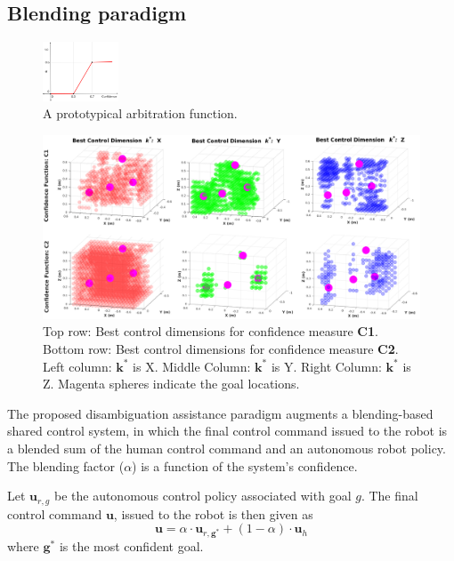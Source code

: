 \documentclass[conference]{IEEEtran}
\begin{document}
\subsection{Blending paradigm}\label{BP}
\begin{figure}
	\begin{center}
		\vspace{-0.9cm}
		\includegraphics[width=0.2\textwidth]{./figures/ArbFunc.png}
	\end{center}
	\caption{A prototypical arbitration function.}
	\label{ALPHA}
\end{figure}
\begin{figure}[ht]
	\centering
	\includegraphics[width = 1\hsize, height = 0.35\vsize]{./figures/POINT_CLOUD.png}
	\caption{Top row: Best control dimensions for confidence measure \textbf{C1}. Bottom row: Best control dimensions for confidence measure \textbf{C2}. Left column: $\boldsymbol{k}^*$ is X. Middle Column: $\boldsymbol{k}^*$ is Y. Right Column: $\boldsymbol{k}^*$ is Z. Magenta spheres indicate the goal locations.}
	\label{HM_SEP}
\end{figure}
The proposed disambiguation assistance paradigm augments a blending-based shared control system, in which the final control command issued to the robot is a blended sum of the human control command and an autonomous robot policy. The blending factor ($\alpha$) is a function of the system's confidence.

Let $\boldsymbol{u}_{r,g}$ be the autonomous control policy associated with goal $g$. The final control command $\boldsymbol{u}$, issued to the robot is then given as 
\begin{equation*}
\boldsymbol{u} = \alpha\cdot \boldsymbol{u}_{r,\boldsymbol{g}^*} + (1 - \alpha)\cdot \boldsymbol{u}_h
\end{equation*}
where $\boldsymbol{g}^*$ is the most confident goal. 
\end{document}
